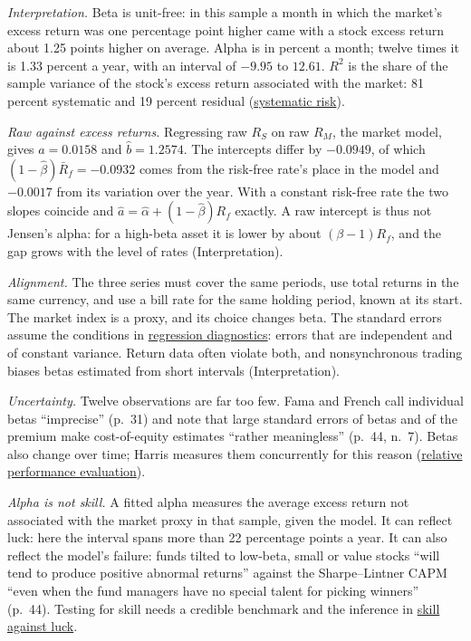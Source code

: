 \begin{qfmethod}
\emph{Interpretation.} Beta is unit-free: in this sample a month in which the market's excess return was one percentage point higher came with a stock excess return about 1.25 points higher on average. Alpha is in percent a month; twelve times it is 1.33 percent a year, with an interval of $-9.95$ to $12.61$. $R^2$ is the share of the sample variance of the stock's excess return associated with the market: 81 percent systematic and 19 percent residual (\hyperref[mech:systematic-risk-pricing]{systematic risk}).

\emph{Raw against excess returns.} Regressing raw $R_S$ on raw $R_M$, the market model, gives $\hat a=0.0158$ and $\hat b=1.2574$. The intercepts differ by $-0.0949$, of which $(1-\hat\beta)\bar R_f=-0.0932$ comes from the risk-free rate's place in the model and $-0.0017$ from its variation over the year. With a constant risk-free rate the two slopes coincide and $\hat a=\hat\alpha+(1-\hat\beta)R_f$ exactly. A raw intercept is thus not Jensen's alpha: for a high-beta asset it is lower by about $(\beta-1)R_f$, and the gap grows with the level of rates (Interpretation).

 \emph{Alignment.} The three series must cover the same periods, use total returns in the same currency, and use a bill rate for the same holding period, known at its start. The market index is a proxy, and its choice changes beta. The standard errors assume the conditions in \hyperref[meth:regression-diagnostics-anova]{regression diagnostics}: errors that are independent and of constant variance. Return data often violate both, and nonsynchronous trading biases betas estimated from short intervals (Interpretation).

\emph{Uncertainty.} Twelve observations are far too few. Fama and French call individual betas ``imprecise'' (p.~31) and note that large standard errors of betas and of the premium make cost-of-equity estimates ``rather meaningless'' (p.~44, n.~7). Betas also change over time; Harris measures them concurrently for this reason (\hyperref[meth:relative-performance-evaluation]{relative performance evaluation}).

\emph{Alpha is not skill.} A fitted alpha measures the average excess return not associated with the market proxy in that sample, given the model. It can reflect luck: here the interval spans more than 22 percentage points a year. It can also reflect the model's failure: funds tilted to low-beta, small or value stocks ``will tend to produce positive abnormal returns'' against the Sharpe--Lintner CAPM ``even when the fund managers have no special talent for picking winners'' (p.~44). Testing for skill needs a credible benchmark and the inference in \hyperref[meth:skill-luck-significance-tests]{skill against luck}.


\end{qfmethod}
